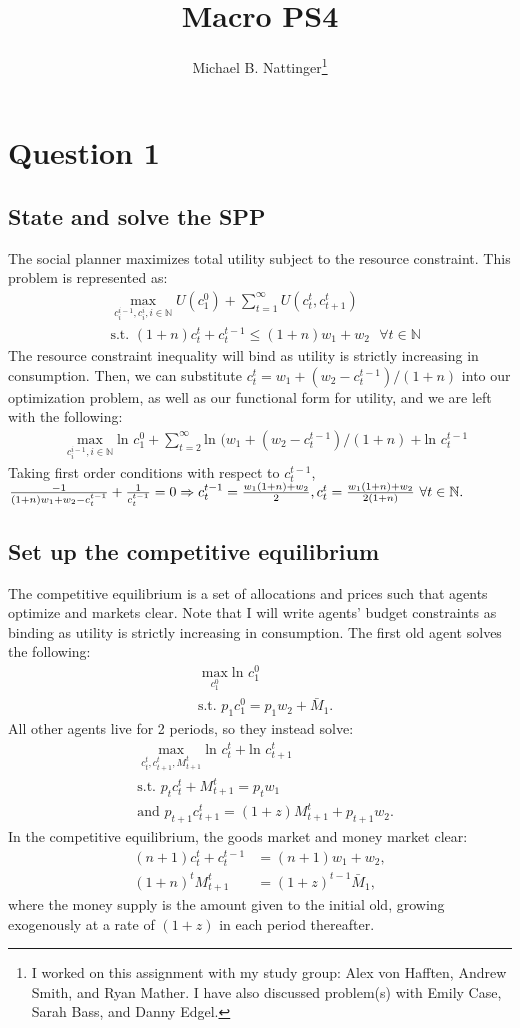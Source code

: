 \documentclass[11pt]{article} %
\title{Macro PS4}
\author{Michael B. Nattinger\footnote{I worked on this assignment with my study group: Alex von Hafften, Andrew Smith, and Ryan Mather. I have also discussed problem(s) with Emily Case, Sarah Bass, and Danny Edgel.}}
\begin{document}
\maketitle

\section{Question 1}
\subsection{State and solve the SPP}
The social planner maximizes total utility subject to the resource constraint. This problem is represented as:
\begin{align*}
&\max_{c_{i}^{i-1},c_i^i, i \in \mathbb{N}} U(c_1^0) + \sum_{t=1}^{\infty} U(c_t^t,c_{t+1}^t)\\
&\text{s.t. } (1+n)c_t^t +c_t^{t-1} \leq (1+n)w_1 + w_2 \text{ } \forall t \in \mathbb{N}
\end{align*}
The resource constraint inequality will bind as utility is strictly increasing in consumption. Then, we can substitute $c_t^t = w_1+(w_2-c_t^{t-1})/(1+n)$ into our optimization problem, as well as our functional form for utility, and we are left with the following:
\begin{align*}
&\max_{c_{i}^{i-1}, i \in \mathbb{N}} \text{ln }c_1^0 + \sum_{t=2}^{\infty} \text{ln }(w_1+(w_2-c_t^{t-1})/(1+n) + \text{ln }c_{t}^{t-1}
\end{align*}
Taking first order conditions with respect to $c_t^{t-1}$, $\frac{-1}{(1+n)w_1+w_2-c_t^{t-1}} + \frac{1}{c_t^{t-1}} = 0 \\ \Rightarrow c_t^{t-1} = \frac{w_1(1+n)+w_2}{2}, c_t^t = \frac{w_1(1+n)+w_2}{2(1+n)} \text{ } \forall t \in \mathbb{N}.$ 
\subsection{Set up the competitive equilibrium}
The competitive equilibrium is a set of allocations and prices such that agents optimize and markets clear. Note that I will write agents' budget constraints as binding as utility is strictly increasing in consumption. The first old agent solves the following:
\begin{align*}
&\max_{c_1^0} \text{ln } c_1^0 \\
&\text{s.t. } p_1c_1^0 = p_1w_2 + \bar{M}_1.
\end{align*}
All other agents live for 2 periods, so they instead solve:
\begin{align*}
&\max_{c_t^t,c_{t+1}^t,M_{t+1}^t} \text{ln } c_t^t + \text{ln } c_{t+1}^t \\
&\text{s.t. } p_tc_t^t + M^t_{t+1}= p_tw_1 \\
&\text{and } p_{t+1}c_{t+1}^t = (1+z)M_{t+1}^t  + p_{t+1}w_2.
\end{align*}
In the competitive equilibrium, the goods market and money market clear:
\begin{align*}
(n+1)c_t^t +c_t^{t-1} &= (n+1)w_1 + w_2, \\
(1+n)^tM_{t+1}^t  &= (1+z)^{t-1}\bar{M}_1,
\end{align*}
where the money supply is the amount given to the initial old, growing exogenously at a rate of $(1+z)$ in each period thereafter.
\end{document}
